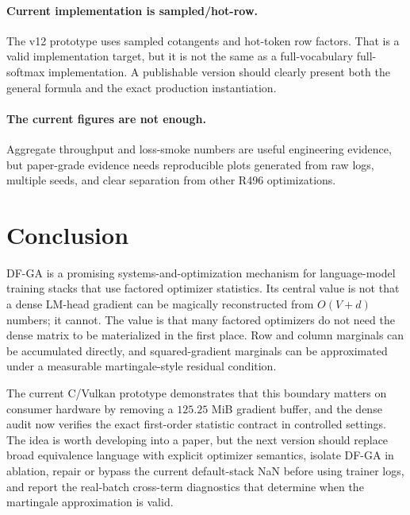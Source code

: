 \documentclass{article}
\begin{document}
\paragraph{Current implementation is sampled/hot-row.}
The v12 prototype uses sampled cotangents and hot-token row factors. That is a
valid implementation target, but it is not the same as a full-vocabulary
full-softmax implementation. A publishable version should clearly present both
the general formula and the exact production instantiation.

\paragraph{The current figures are not enough.}
Aggregate throughput and loss-smoke numbers are useful engineering evidence,
but paper-grade evidence needs reproducible plots generated from raw logs,
multiple seeds, and clear separation from other R496 optimizations.

\section{Conclusion}

DF-GA is a promising systems-and-optimization mechanism for language-model
training stacks that use factored optimizer statistics. Its central value is not
that a dense LM-head gradient can be magically reconstructed from $O(V+d)$
numbers; it cannot. The value is that many factored optimizers do not need the
dense matrix to be materialized in the first place. Row and column marginals can
be accumulated directly, and squared-gradient marginals can be approximated
under a measurable martingale-style residual condition.

The current C/Vulkan prototype demonstrates that this boundary matters on
consumer hardware by removing a $125.25$ MiB gradient buffer, and the dense
audit now verifies the exact first-order statistic contract in controlled
settings. The idea is worth developing into a paper, but the next version
should replace broad equivalence language with explicit optimizer semantics,
isolate DF-GA in ablation, repair or bypass the current default-stack NaN before
using trainer logs, and report the real-batch cross-term diagnostics that
determine when the martingale approximation is valid.



\end{document}
